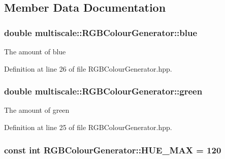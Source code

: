 \subsection{Member Data Documentation}
\hypertarget{classmultiscale_1_1RGBColourGenerator_a5b48dae9174a794eb70c779c05d87c3f}{
\subsubsection[{blue}]{\setlength{\rightskip}{0pt plus 5cm}double multiscale\-::\-R\-G\-B\-Colour\-Generator\-::blue\hspace{0.3cm}{\ttfamily [private]}}}\label{classmultiscale_1_1RGBColourGenerator_a5b48dae9174a794eb70c779c05d87c3f}
The amount of blue 

Definition at line 26 of file R\-G\-B\-Colour\-Generator.\-hpp.

\hypertarget{classmultiscale_1_1RGBColourGenerator_ae8d94d24b109954be1da2a04c8ec9af7}{
\subsubsection[{green}]{\setlength{\rightskip}{0pt plus 5cm}double multiscale\-::\-R\-G\-B\-Colour\-Generator\-::green\hspace{0.3cm}{\ttfamily [private]}}}\label{classmultiscale_1_1RGBColourGenerator_ae8d94d24b109954be1da2a04c8ec9af7}
The amount of green 

Definition at line 25 of file R\-G\-B\-Colour\-Generator.\-hpp.

\hypertarget{classmultiscale_1_1RGBColourGenerator_a282d986019f3c02b46c122badf806cd0}{
\subsubsection[{H\-U\-E\-\_\-\-M\-A\-X}]{\setlength{\rightskip}{0pt plus 5cm}const int R\-G\-B\-Colour\-Generator\-::\-H\-U\-E\-\_\-\-M\-A\-X = 120\hspace{0.3cm}{\ttfamily [static]}}}\label{classmultiscale_1_1RGBColourGenerator_a282d986019f3c02b46c122badf806cd0}


